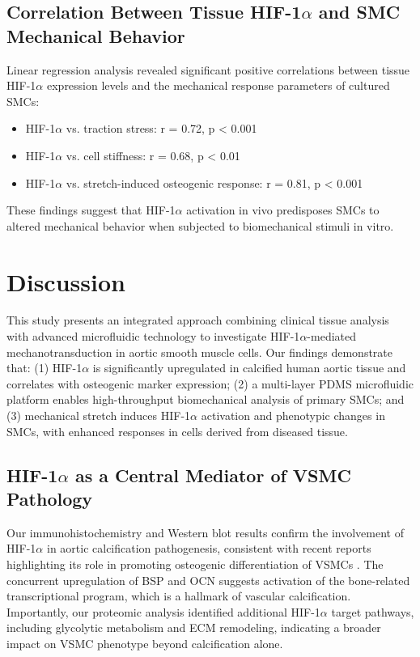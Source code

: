\documentclass[materials,article,submit,moreauthors,pdftex]{Definitions/mdpi}
\begin{document}
\subsection{Correlation Between Tissue HIF-1$\alpha$ and SMC Mechanical Behavior}

Linear regression analysis revealed significant positive correlations between tissue HIF-1$\alpha$ expression levels and the mechanical response parameters of cultured SMCs:

\begin{itemize}
    \item HIF-1$\alpha$ vs. traction stress: r = 0.72, p < 0.001
    \item HIF-1$\alpha$ vs. cell stiffness: r = 0.68, p < 0.01
    \item HIF-1$\alpha$ vs. stretch-induced osteogenic response: r = 0.81, p < 0.001
\end{itemize}

These findings suggest that HIF-1$\alpha$ activation in vivo predisposes SMCs to altered mechanical behavior when subjected to biomechanical stimuli in vitro.

\section{Discussion}

This study presents an integrated approach combining clinical tissue analysis with advanced microfluidic technology to investigate HIF-1$\alpha$-mediated mechanotransduction in aortic smooth muscle cells. Our findings demonstrate that: (1) HIF-1$\alpha$ is significantly upregulated in calcified human aortic tissue and correlates with osteogenic marker expression; (2) a multi-layer PDMS microfluidic platform enables high-throughput biomechanical analysis of primary SMCs; and (3) mechanical stretch induces HIF-1$\alpha$ activation and phenotypic changes in SMCs, with enhanced responses in cells derived from diseased tissue.

\subsection{HIF-1$\alpha$ as a Central Mediator of VSMC Pathology}

Our immunohistochemistry and Western blot results confirm the involvement of HIF-1$\alpha$ in aortic calcification pathogenesis, consistent with recent reports highlighting its role in promoting osteogenic differentiation of VSMCs \cite{mokas2016hypoxia}. The concurrent upregulation of BSP and OCN suggests activation of the bone-related transcriptional program, which is a hallmark of vascular calcification. Importantly, our proteomic analysis identified additional HIF-1$\alpha$ target pathways, including glycolytic metabolism and ECM remodeling, indicating a broader impact on VSMC phenotype beyond calcification alone.
\end{document}
